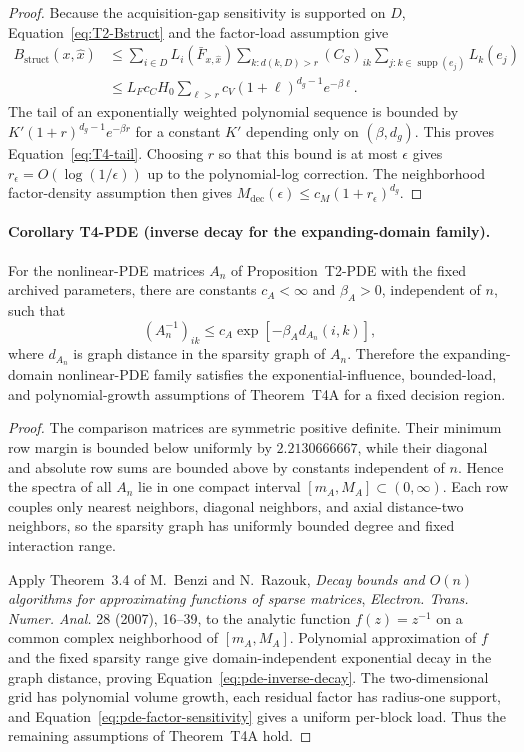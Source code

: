 \begin{proof}
Because the acquisition-gap sensitivity is supported on $D$,
Equation~\eqref{eq:T2-Bstruct} and the factor-load assumption give
\begin{align*}
B_{\mathrm{struct}}(x,\widehat x)
&\le
\sum_{i\in D}L_i(\bar F_{x,\widehat x})
\sum_{k:d(k,D)>r}
(C_S)_{ik}
\sum_{j:k\in\operatorname{supp}(e_j)}L_k(e_j)\\
&\le
L_F c_C H_0
\sum_{\ell>r}c_V(1+\ell)^{d_g-1}e^{-\beta\ell}.
\end{align*}
The tail of an exponentially weighted polynomial sequence is bounded by
$K'(1+r)^{d_g-1}e^{-\beta r}$ for a constant $K'$ depending only on
$(\beta,d_g)$.  This proves Equation~\eqref{eq:T4-tail}.  Choosing $r$ so that
this bound is at most $\epsilon$ gives
$r_\epsilon=O(\log(1/\epsilon))$ up to the polynomial-log correction.  The
neighborhood factor-density assumption then gives
$M_{\mathrm{dec}}(\epsilon)\le c_M(1+r_\epsilon)^{d_g}$.
\end{proof}

\paragraph{Corollary T4-PDE (inverse decay for the expanding-domain family).}
For the nonlinear-PDE matrices $A_n$ of Proposition~T2-PDE with the fixed
archived parameters, there are constants $c_A<\infty$ and $\beta_A>0$,
independent of $n$, such that
\begin{equation}
    (A_n^{-1})_{ik}
    \le c_A\exp[-\beta_A d_{A_n}(i,k)],
    \label{eq:pde-inverse-decay}
\end{equation}
where $d_{A_n}$ is graph distance in the sparsity graph of $A_n$.  Therefore
the expanding-domain nonlinear-PDE family satisfies the exponential-influence,
bounded-load, and polynomial-growth assumptions of Theorem~T4A for a fixed
decision region.

\begin{proof}
The comparison matrices are symmetric positive definite.  Their minimum row
margin is bounded below uniformly by $2.2130666667$, while their diagonal and
absolute row sums are bounded above by constants independent of $n$.  Hence
the spectra of all $A_n$ lie in one compact interval $[m_A,M_A]\subset(0,\infty)$.
Each row couples only nearest neighbors, diagonal neighbors, and axial
distance-two neighbors, so the sparsity graph has uniformly bounded degree and
fixed interaction range.

Apply Theorem~3.4 of M.~Benzi and N.~Razouk, \emph{Decay bounds and $O(n)$
algorithms for approximating functions of sparse matrices}, \emph{Electron.
Trans. Numer. Anal.} 28 (2007), 16--39, to the analytic function $f(z)=z^{-1}$
on a common complex neighborhood of $[m_A,M_A]$.  Polynomial approximation of
$f$ and the fixed sparsity range give domain-independent exponential decay in
the graph distance, proving Equation~\eqref{eq:pde-inverse-decay}.  The
two-dimensional grid has polynomial volume growth, each residual factor has
radius-one support, and Equation~\eqref{eq:pde-factor-sensitivity} gives a
uniform per-block load.  Thus the remaining assumptions of Theorem~T4A hold.
\end{proof}

